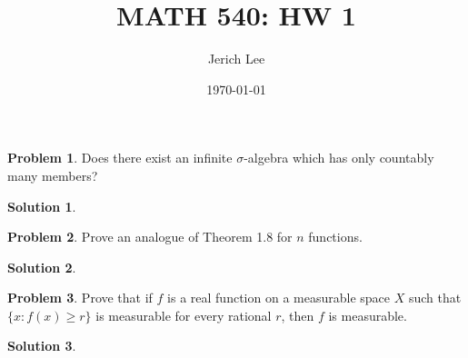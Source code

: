 \documentclass[12pt]{article}
\title{MATH 540: HW 1}
\author{Jerich Lee}
\date{\today}
\theoremstyle{definition} %
\newtheorem{solution}{Solution}
\newtheorem{problem}{Problem}
\theoremstyle{plain} %
\begin{document}
\maketitle
\begin{problem}
  Does there exist an infinite $\sigma$-algebra which has only countably many members?
  \end{problem}

  \begin{solution}
    
  \end{solution}
  \begin{problem}
    Prove an analogue of Theorem 1.8 for $n$ functions.
    \end{problem}

    \begin{solution}
      
    \end{solution}
    \begin{problem}
       Prove that if $f$ is a real function on a measurable space $X$ such that $\{x : f(x) \ge r\}$ is measurable for every rational $r$, then $f$ is measurable.
      \end{problem}

      \begin{solution}
        
      \end{solution}
\end{document}
